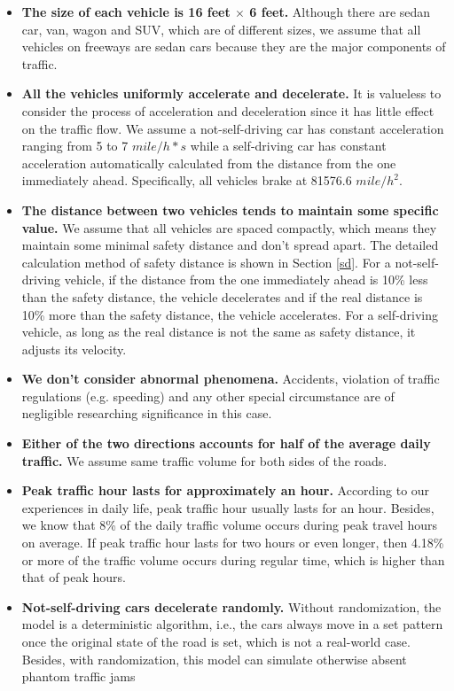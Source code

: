 \documentclass[a4paper]{article}
\begin{document}
	\begin{itemize}
		\item \textbf{The size of each vehicle is 16 feet $\times$ 6 feet.} Although there are sedan car, van, wagon and SUV, which are of different sizes, we assume that all vehicles on freeways are sedan cars because they are the major components of traffic.
		\item \textbf{All the vehicles uniformly accelerate and decelerate.} It is valueless to consider the process of acceleration and deceleration since it has little effect on the traffic flow. We assume a not-self-driving car has constant acceleration ranging from 5 to 7 $mile/h*s$ while a self-driving car has constant acceleration automatically calculated from the distance from the one immediately ahead. Specifically, all vehicles brake at 81576.6 $mile/h^2$. 
		\item \textbf{The distance between two vehicles tends to maintain some specific value.} We assume that all vehicles are spaced compactly, which means they maintain some minimal safety distance and don’t spread apart. The detailed calculation method of safety distance is shown in Section \ref{sd}. For a not-self-driving vehicle, if the distance from the one immediately ahead is 10\% less than the safety distance, the vehicle decelerates and if the real distance is 10\% more than the safety distance, the vehicle accelerates. For a self-driving vehicle, as long as the real distance is not the same as safety distance, it adjusts its velocity. 
		\item \textbf{We don’t consider abnormal phenomena.} Accidents, violation of traffic regulations (e.g. speeding) and any other special circumstance are of negligible researching significance in this case.
		\item \textbf{Either of the two directions accounts for half of the average daily traffic.} We assume same traffic volume for both sides of the roads.
		\item \textbf{Peak traffic hour lasts for approximately an hour.}  According to our experiences in daily life, peak traffic hour usually lasts for an hour. Besides, we know that 8\% of the daily traffic volume occurs during peak travel hours on average. If peak traffic hour lasts for two hours or even longer, then 4.18\% or more of the traffic volume occurs during regular time, which is higher than that of peak hours.
		\item \textbf{Not-self-driving cars decelerate randomly.} Without randomization, the model is a deterministic algorithm, i.e., the cars always move in a set pattern once the original state of the road is set, which is not a real-world case. Besides, with randomization, this model can simulate otherwise absent phantom traffic jams \footnotemark {}
\end{itemize}
\end{document}
